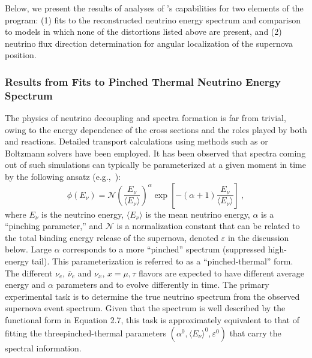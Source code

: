 Below, we present the results of analyses 
of 's capabilities for two elements of the  
 program: (1) fits to the reconstructed 
neutrino energy spectrum and comparison to models in which 
none of the distortions listed above are present, and (2) 
neutrino flux direction determination for angular localization 
of the supernova position.

\subsubsection{Results from Fits to Pinched Thermal Neutrino Energy Spectrum}

The physics of neutrino decoupling and spectra formation is far from trivial, owing to the energy dependence of the cross sections and the roles played by both  and  reactions.
Detailed transport calculations using methods such as  or Boltzmann solvers have been employed. It has been observed that spectra coming out of such simulations can typically be parameterized at a given moment in time by the following ansatz (e.g.,~\cite{Minakata:2008nc,Tamborra:2012ac}):
\begin{equation}
        \label{eq:pinched}
        \phi(E_{\nu}) = \mathcal{N} 
        \left(\frac{E_{\nu}}{\langle E_{\nu} \rangle}\right)^{\alpha} \exp\left[-\left(\alpha + 1\right)\frac{E_{\nu}}{\langle E_{\nu} \rangle}\right] \ ,
\end{equation}
where $E_{\nu}$ is the neutrino energy, $\langle E_\nu \rangle$ is the
mean neutrino energy, $\alpha$ is a ``pinching parameter,'' and
$\mathcal{N}$ is a normalization constant that can be related to 
the total binding energy release of the supernova, denoted $\varepsilon$ 
in the discussion below.
%
Large $\alpha$ corresponds to a more ``pinched'' spectrum (suppressed
high-energy tail). This parameterization is referred to as a
``pinched-thermal'' form. The different $\nu_e$, $\overline{\nu}_e$ and
$\nu_x, \, x = \mu, \tau$ flavors are expected to have different
average energy and $\alpha$ parameters and to evolve differently in
time. 
The primary experimental task is to determine the true neutrino spectrum from the observed supernova event spectrum.  Given that the spectrum is well described by the functional form in Equation 2.7, this task is approximately equivalent to that of fitting the threepinched-thermal parameters  $(\alpha^0, \langle E_\nu \rangle^0, \varepsilon^0)$ that carry the spectral information.  

